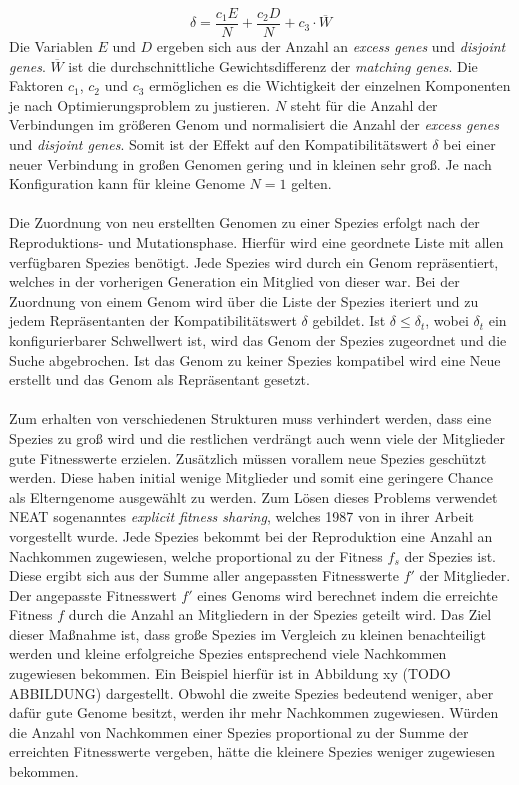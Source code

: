 $$\delta=\frac{c_1E}{N}+\frac{c_2D}{N}+c_3 \cdot \overline{W}$$
Die Variablen $E$ und $D$ ergeben sich aus der Anzahl an \emph{excess genes} und \emph{disjoint genes}. $\overline{W}$ ist die durchschnittliche Gewichtsdifferenz der \emph{matching genes}. Die Faktoren $c_1$, $c_2$ und $c_3$ ermöglichen es die Wichtigkeit der einzelnen Komponenten je nach Optimierungsproblem zu justieren. $N$ steht für die Anzahl der Verbindungen im größeren Genom und normalisiert die Anzahl der \emph{excess genes} und \emph{disjoint genes}. Somit ist der Effekt auf den Kompatibilitätswert $\delta$ bei einer neuer Verbindung in großen Genomen gering und in kleinen sehr groß. Je nach Konfiguration kann für kleine Genome $N=1$ gelten.
\\\\
Die Zuordnung von neu erstellten Genomen zu einer Spezies erfolgt nach der Reproduktions- und Mutationsphase. Hierfür wird eine geordnete Liste mit allen verfügbaren Spezies benötigt. Jede Spezies wird durch ein Genom repräsentiert, welches in der vorherigen Generation ein Mitglied von dieser war. Bei der Zuordnung von einem Genom wird über die Liste der Spezies iteriert und zu jedem Repräsentanten der Kompatibilitätswert $\delta$ gebildet. Ist $\delta \leq \delta_t$, wobei $\delta_t$ ein konfigurierbarer Schwellwert ist, wird das Genom der Spezies zugeordnet und die Suche abgebrochen. Ist das Genom zu keiner Spezies kompatibel wird eine Neue erstellt und das Genom als Repräsentant gesetzt.
\\\\
Zum erhalten von verschiedenen Strukturen muss verhindert werden, dass eine Spezies zu groß wird und die restlichen verdrängt auch wenn viele der Mitglieder gute Fitnesswerte erzielen. Zusätzlich müssen vorallem neue Spezies geschützt werden. Diese haben initial wenige Mitglieder und somit eine geringere Chance als Elterngenome ausgewählt zu werden. Zum Lösen dieses Problems verwendet \ac{NEAT} sogenanntes \emph{explicit fitness sharing}, welches 1987 von \citeauthor{goldberg1987genetic} in ihrer Arbeit \cite{goldberg1987genetic} vorgestellt wurde. Jede Spezies bekommt bei der Reproduktion eine Anzahl an Nachkommen zugewiesen, welche proportional zu der Fitness $f_{s}$ der Spezies ist. Diese ergibt sich aus der Summe aller angepassten Fitnesswerte $f'$ der Mitglieder. Der angepasste Fitnesswert $f'$ eines Genoms wird berechnet indem die erreichte Fitness $f$ durch die Anzahl an Mitgliedern in der Spezies geteilt wird. Das Ziel dieser Maßnahme ist, dass große Spezies im Vergleich zu kleinen benachteiligt werden und kleine erfolgreiche Spezies entsprechend viele Nachkommen zugewiesen bekommen. Ein Beispiel hierfür ist in Abbildung xy (TODO ABBILDUNG) dargestellt. Obwohl die zweite Spezies bedeutend weniger, aber dafür gute Genome besitzt, werden ihr mehr Nachkommen zugewiesen. Würden die Anzahl von Nachkommen einer Spezies proportional zu der Summe der erreichten Fitnesswerte vergeben, hätte die kleinere Spezies weniger zugewiesen bekommen. 
